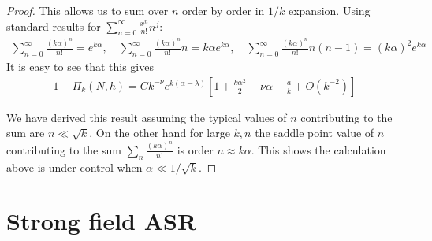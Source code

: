 \documentclass{article}
\theoremstyle{remark} %
\begin{document}
\begin{proof}
This allows us to sum over $n$ order by order in $1/k$ expansion. Using standard results for $\sum_{n=0}^\infty \frac{x^n}{n!}n^j$:
\begin{align}
\sum_{n=0}^\infty \frac{(k\alpha)^n}{n!} = e^{k\alpha},\quad
\sum_{n=0}^\infty \frac{(k\alpha)^n}{n!}n = k\alpha e^{k\alpha},\quad 
\sum_{n=0}^\infty \frac{(k\alpha)^n}{n!}n(n-1) = (k\alpha)^2 e^{k\alpha}
\end{align}
It is easy to see that this gives
\begin{equation}
\begin{aligned}
1-\Pi_k(N,h) = C k^{-\nu} e^{k(\alpha-\lambda)}\left[1 + \frac{k\alpha^2}{2} - \nu\alpha - \frac{a}{k} + O(k^{-2})\right]
\end{aligned}
\label{eq:gap_intermediate}
\end{equation}

We have derived this result assuming the typical values of $n$ contributing to the sum are $n \ll \sqrt{k}$. On the other hand for large $k,n$ the saddle point value of $n$ contributing to the sum $\sum_n \frac{(k\alpha)^n}{n!}$ is order $n \approx k\alpha$. This shows the calculation above is under control when $\alpha \ll 1/\sqrt{k}$.


\end{proof}








\section{Strong field ASR}
\label{app:Strong field ASR}
\end{document}

